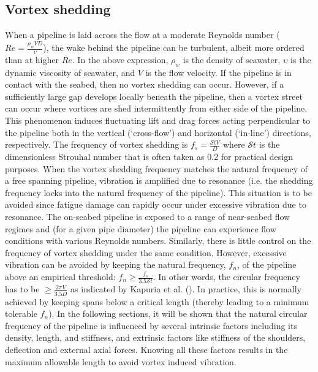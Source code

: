 \documentclass[3p,doublespacing,authoryear,11pt]{elsarticle} %
\begin{document}
\subsection{Vortex shedding} 
When a pipeline is laid across the flow at a moderate Reynolds number ($Re = \frac{\rho_w V D}{\upsilon}$), the wake behind the pipeline can be turbulent, albeit more ordered than at higher $Re$. In the above expression, $\rho_w$ is the density of seawater, $\upsilon$ is the dynamic viscosity of seawater, and $V$ is the flow velocity. If the pipeline is in contact with the seabed, then no vortex shedding can occur. However, if a sufficiently large gap develops locally beneath the pipeline, then a vortex street can occur where vortices are shed intermittently from either side of the pipeline. This phenomenon induces fluctuating lift and drag forces acting perpendicular to the pipeline both in the vertical (`cross-flow') and horizontal (`in-line') directions, respectively. The frequency of vortex shedding is $f_s = \frac{\mathcal{S}t V}{D}$ where $\mathcal{S}t$ is the dimensionless Strouhal number that is often taken as 0.2 for practical design purposes. When the vortex shedding frequency matches the natural frequency of a free spanning pipeline, vibration is amplified due to resonance (i.e. the shedding frequency locks into the natural frequency of the pipeline). This situation is to be avoided since fatigue damage can rapidly occur under excessive vibration due to resonance. The on-seabed pipeline is exposed to a range of near-seabed flow regimes and (for a given pipe diameter) the pipeline can experience flow conditions with various Reynolds numbers. Similarly, there is little control on the frequency of vortex shedding under the same condition. However, excessive vibration can be avoided by keeping the natural frequency, $f_n$, of the pipeline above an empirical threshold: $f_n \ge \frac{f_s}{3.5 \mathcal{S}t}$. In other words, the circular frequency has to be $\ge  \frac{2 \pi V}{3.5 D}$ as indicated by Kapuria et al. (\citeyear{Kapuria:1998aa}). In practice, this is normally achieved by keeping spans below a critical length (thereby leading to a minimum tolerable $f_n$). In the following sections, it will be shown that the natural circular frequency of the pipeline is influenced by several intrinsic factors including its density, length, and stiffness, and extrinsic factors like stiffness of the shoulders, deflection and external axial forces. Knowing all these factors results in the maximum allowable length to avoid vortex induced vibration.  
\end{document}
